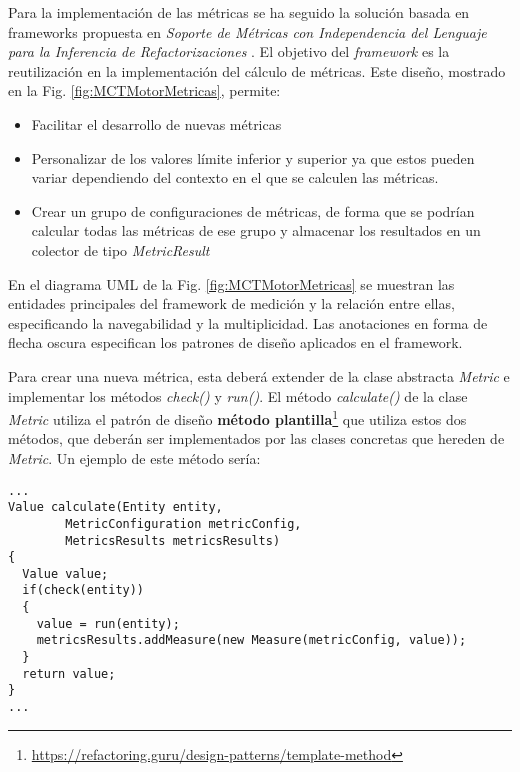 Para la implementación de las métricas se ha seguido la solución basada en frameworks propuesta en \textit{Soporte de Métricas con Independencia del Lenguaje para la Inferencia de Refactorizaciones} \citep{marticorena_soporte_2005}. El objetivo del \textit{framework} es la reutilización en la implementación del cálculo de métricas. Este diseño, mostrado en la Fig. \ref{fig:MCTMotorMetricas}, permite:

\begin{itemize}
	\item Facilitar el desarrollo de nuevas métricas
	\item Personalizar de los valores límite inferior y superior ya que estos pueden variar dependiendo del contexto en el que se calculen las métricas.
	\item Crear un grupo de configuraciones de métricas, de forma que se podrían calcular todas las métricas de ese grupo y almacenar los resultados en un colector de tipo \textit{MetricResult}
\end{itemize}


En el diagrama UML de la Fig. \ref{fig:MCTMotorMetricas} se muestran las entidades principales del framework de medición y la relación entre ellas, especificando la navegabilidad y la multiplicidad. Las anotaciones en forma de flecha oscura especifican los patrones de diseño \citep{gamma_patrones_2002} aplicados en el framework.

Para crear una nueva métrica, esta deberá extender de la clase abstracta \textit{Metric} e implementar los métodos \textit{check()} y \textit{run()}. El método \textit{calculate()} de la clase \textit{Metric} utiliza el patrón de diseño \textbf{método plantilla}\footnote{\url{https://refactoring.guru/design-patterns/template-method}} que utiliza estos dos métodos, que deberán ser implementados por las clases concretas que hereden de \textit{Metric}. Un ejemplo de este método sería:

\begin{minipage}{\linewidth}
{\tiny
\begin{lstlisting}[breaklines]
...
Value calculate(Entity entity, 
		MetricConfiguration metricConfig, 
		MetricsResults metricsResults) 
{
  Value value;
  if(check(entity))
  {
    value = run(entity);
    metricsResults.addMeasure(new Measure(metricConfig, value));
  }
  return value;
}
...
\end{lstlisting}
}
\end{minipage}

